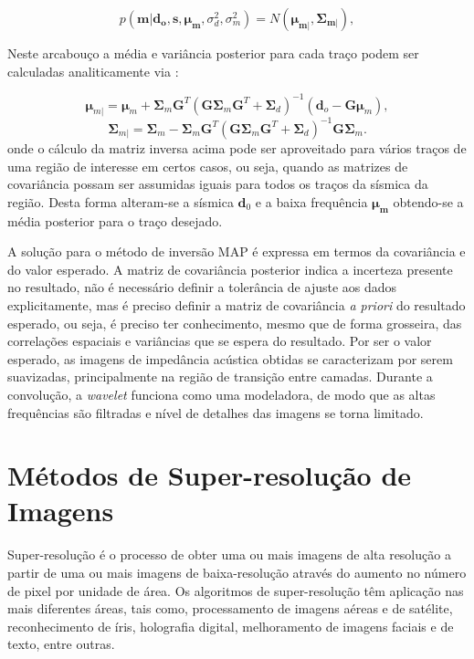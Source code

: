 \begin{equation}
p(\boldsymbol{m}|\boldsymbol{d_{o}},\boldsymbol{s},\boldsymbol{\mu_{m}},\sigma_{d}^{2},\sigma_{m}^{2}) = 
N(\boldsymbol{\mu_{m|}},\boldsymbol{\Sigma_{m|}}),
\end{equation} 

Neste arcabouço a média e variância posterior para cada traço podem ser
calculadas analiticamente via \citep{leandroGRSL}:

\begin{equation}
\label{eqn:mapSolution}
\boldsymbol{\mu}_{m|} = \boldsymbol{\mu}_{m} + \boldsymbol{\Sigma}_{m}\boldsymbol{G}^{T}(\boldsymbol{G\Sigma}_{m}\boldsymbol{G}^{T}+\boldsymbol{\Sigma}_{d})^{-1}\left ( \boldsymbol{d}_{o} - \boldsymbol{G\mu}_{m} \right ),
\end{equation}
\begin{equation}
\boldsymbol{\Sigma}_{m|} = \boldsymbol{\Sigma}_{m} - \boldsymbol{\Sigma}_{m}\boldsymbol{G}^{T}(\boldsymbol{G\Sigma}_{m}\boldsymbol{G}^{T}+\boldsymbol{\Sigma}_{d})^{-1}\boldsymbol{G\Sigma}_{m}.
\end{equation} 
onde o cálculo da matriz inversa acima pode ser aproveitado para vários traços
de uma região de interesse em certos casos, ou seja, quando as matrizes de
covariância possam ser assumidas iguais para todos os traços da sísmica da região.
Desta forma alteram-se a sísmica $\mathbf{d}_0$ e a baixa frequência
$\boldsymbol{\mu_m}$ obtendo-se a média posterior para o traço desejado.
  
A solução para o método de inversão MAP é expressa em termos da covariância
e do valor esperado. 
A matriz de covariância posterior indica a incerteza presente no resultado, não é necessário
definir a tolerância de ajuste aos dados explicitamente, mas é preciso definir a
matriz de covariância \textit{a priori} do resultado esperado, ou seja, é
preciso ter conhecimento, mesmo que de forma grosseira, das correlações espaciais e
variâncias que se espera do resultado.
Por ser o valor esperado, as imagens de impedância acústica obtidas
se caracterizam por serem suavizadas, principalmente na região de
transição entre camadas. Durante a convolução, a \textit{wavelet} funciona
como uma modeladora, de modo que as altas frequências são filtradas
e nível de detalhes das imagens se torna limitado. 

\section{Métodos de Super-resolução de Imagens}
Super-resolução é o processo de obter uma ou mais imagens de alta
resolução a partir de uma ou mais imagens de baixa-resolução
através do aumento no número de pixel por unidade de área.
Os algoritmos de super-resolução têm aplicação nas mais diferentes áreas,
tais como, processamento de imagens aéreas e de satélite, reconhecimento de
íris, holografia digital, melhoramento de imagens faciais e de texto, entre
outras.

